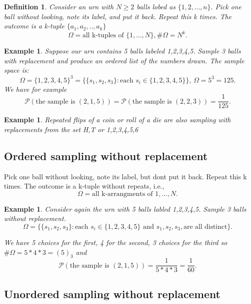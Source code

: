 \documentclass[a4paper]{article}
\newcounter{counter}
\numberwithin{counter}{subsection}
\theoremstyle{break}
\newtheorem{definition}{Definition}
\newtheorem{exmp}[counter]{Example}
\begin{document}
	\begin{definition}
		Consider an urn with $N \ge 2$ balls lobed as $\{1,2,\ldots,n\} $. Pick one ball without looking, note its label, and put it back. Repeat this k times. The outcome is a k-tuple $\{a_1,a_2,..,a_k\} $ \[
            \Omega = {\text{all k-tuples of } \{1,\ldots,N\}}, \#\Omega = N^{k}
		.\] 
	\end{definition}
	
	\begin{exmp}
	Suppose our urn contains 5 balls labeled 1,2,3,4,5. Sample 3 balls with replacement and produce an ordered list of the numbers drawn. 
	The sample space is: \[
        \Omega = \{1,2,3,4,5\}^{3}= \{\{s_1,s_2,s_3\}: \text{each } s_i \in \{1,2,3,4,5\} \}, \: \Omega = 5^3=125
	.\]  
	We have for example \[
        \mathcal{P}(\text{the sample is } (2,1,5)) = \mathcal{P}(\text{the sample is } (2,2,3)) = \frac{1}{125}
	.\] 
	\end{exmp}

	\begin{exmp}
		Repeated flips of a coin or roll of a die are also sampling with replacements from the set {H,T} or {1,2,3,4,5,6}
	\end{exmp}

\subsection{Ordered sampling without replacement}%

Pick one ball without looking, note its label, but dont put it back. Repeat this k times. The outcome is a k-tuple without repeats, i.e., \[
    \Omega = {\text{all k-arrangments of 1},\ldots,N}
.\]   

\begin{exmp}
	Consider again the urn with 5 balls labled 1,2,3,4,5. Sample 3 balls without replacement. \[
        \Omega = \{\{s_1,s_2,s_3\} : \text{each } s_i \in \{1,2,3,4,5\} \text{ and } s_1,s_2,s_3, \text{are all distinct}\} 
	.\]  

	We have 5 choices for the first, 4 for the second, 3 choices for the third so $\#\Omega = 5 * 4 * 3 = (5)_3 $ and \[
        \mathcal{P}(\text{the sample is } (2,1,5)) = \frac{1}{5 * 4 * 3} = \frac{1}{60}	
	.\] 
\end{exmp}

\subsection{Unordered sampling without replacement}%
\end{document}
